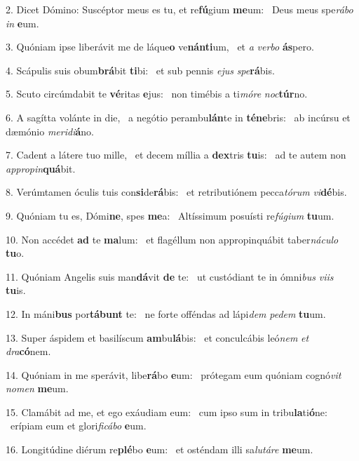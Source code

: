 2. Dicet Dómino: Suscéptor meus es tu, et re\textbf{fú}gium \textbf{me}um: \ast\  Deus meus spe\textit{rá}\textit{bo} \textit{in} \textbf{e}um.\

3. Quóniam ipse liberávit me de láque\textbf{o} ve\textbf{nán}\textbf{ti}um, \ast\  et \textit{a} \textit{ver}\textit{bo} \textbf{ás}pero.\

4. Scápulis suis obum\textbf{brá}bit \textbf{ti}bi: \ast\  et sub pennis \textit{e}\textit{jus} \textit{spe}\textbf{rá}bis.\

5. Scuto circúmdabit te \textbf{vé}ritas \textbf{e}jus: \ast\  non timébis a ti\textit{mó}\textit{re} \textit{noc}\textbf{túr}no.\

6. A sagítta volánte in die, \dag\  a negótio perambu\textbf{lán}te in \textbf{té}\textbf{ne}bris: \ast\  ab incúrsu et dæmónio \textit{me}\textit{ri}\textit{di}\textbf{á}no.\

7. Cadent a látere tuo mille, \dag\  et decem míllia a \textbf{dex}tris \textbf{tu}is: \ast\  ad te autem non \textit{ap}\textit{pro}\textit{pin}\textbf{quá}bit.\

8. Verúmtamen óculis tuis con\textbf{si}de\textbf{rá}bis: \ast\  et retributiónem pecca\textit{tó}\textit{rum} \textit{vi}\textbf{dé}bis.\

9. Quóniam tu es, Dómi\textbf{ne}, spes \textbf{me}a: \ast\  Altíssimum posuísti re\textit{fú}\textit{gi}\textit{um} \textbf{tu}um.\

10. Non accédet \textbf{ad} te \textbf{ma}lum: \ast\  et flagéllum non appropinquábit taber\textit{ná}\textit{cu}\textit{lo} \textbf{tu}o.\

11. Quóniam Angelis suis man\textbf{dá}vit \textbf{de} te: \ast\  ut custódiant te in ómni\textit{bus} \textit{vi}\textit{is} \textbf{tu}is.\

12. In máni\textbf{bus} por\textbf{tá}\textbf{bunt} te: \ast\  ne forte offéndas ad lápi\textit{dem} \textit{pe}\textit{dem} \textbf{tu}um.\

13. Super áspidem et basilíscum \textbf{am}bu\textbf{lá}bis: \ast\  et conculcábis leó\textit{nem} \textit{et} \textit{dra}\textbf{có}nem.\

14. Quóniam in me sperávit, libe\textbf{rá}bo \textbf{e}um: \ast\  prótegam eum quóniam cognó\textit{vit} \textit{no}\textit{men} \textbf{me}um.\

15. Clamábit ad me, et ego exáudiam eum: \dag\  cum ipso sum in tribu\textbf{la}ti\textbf{ó}ne: \ast\  erípiam eum et glori\textit{fi}\textit{cá}\textit{bo} \textbf{e}um.\

16. Longitúdine diérum re\textbf{plé}bo \textbf{e}um: \ast\  et osténdam illi sa\textit{lu}\textit{tá}\textit{re} \textbf{me}um.\

